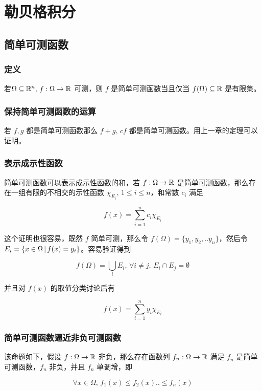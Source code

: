 \chapter{勒贝格积分}

\section{简单可测函数}

\subsection{定义}

若$\Omega \subseteq \mathbb{R}^{n},\, f: \Omega \to \mathbb{R}$ 可测，则 $f$ 是简单可测函数当且仅当 $f(\Omega) \subseteq \mathbb{R}$ 是有限集。 

\subsection{保持简单可测函数的运算}

若 $f,g$ 都是简单可测函数那么
$f + g,\, cf$ 都是简单可测函数。用上一章的定理可以证明。


\subsection{表示成示性函数}

简单可测函数可以表示成示性函数的和，若 $f: \Omega \to \mathbb{R}$ 是简单可测函数，那么存在一组有限的不相交的示性函数 $\chi_{E_i},\, 1 \le i \le n$，和常数 $c_i$ 满足

\[
f(x) = \sum_{i=1}^{n}c_i \chi_{E_i}
\]

这个证明也很容易，既然 $f$ 简单可测，那么令 $f(\Omega) = \{ y_1, y_2, .. y_n\}$，然后令 $E_i = \{ x \in \Omega \,\vert\, f(x) = y_i\}$。容易验证得到

\[
f(\Omega) = \bigcup_{i}E_i,\, \forall i \ne j,\, E_i \cap E_j = \emptyset
\]

并且对 $f(x)$ 的取值分类讨论后有 

\[
f(x) = \sum_{i=1}^{n}y_i \chi_{E_i}
\]


\subsection{简单可测函数逼近非负可测函数}

该命题如下，假设 $f: \Omega \to \mathbb{R}$ 非负，那么存在函数列 $f_n: \Omega \to \mathbb{R}$ 满足 $f_n$ 是简单可测函数，$f_n$ 非负，并且 $f_n$ 单调增，即

\[
\forall x \in \Omega,\, f_1(x) \le f_2(x) .. \le f_n(x) 
\]

